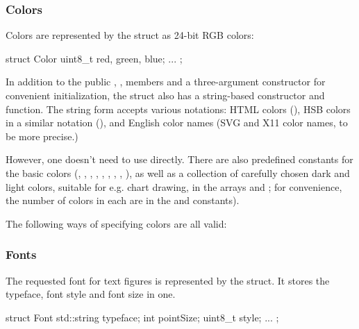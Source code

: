 \subsubsection{Colors}
\label{sec:graphics:canvas-colors}

Colors are represented by the  struct as 24-bit RGB colors:

\begin{cpp}
struct Color {
    uint8_t red, green, blue;
    ...
};
\end{cpp}

In addition to the public , ,  members
and a three-argument constructor for convenient initialization, the struct
also has a string-based constructor and  function.
The string form accepts various notations: HTML colors (),
HSB colors in a similar notation (), and English color names
(SVG and X11 color names, to be more precise.)

However, one doesn't need to use  directly.
There are also predefined constants for the basic colors (,
, , , , , ,
, ), as well as a collection of carefully chosen
dark and light colors, suitable for e.g. chart drawing, in the arrays
 and ; for convenience,
the number of colors in each are in the 
and  constants).

The following ways of specifying colors are all valid:



\subsubsection{Fonts}
\label{sec:graphics:canvas-fonts}

The requested font for text figures is represented by the 
struct. It stores the typeface, font style and font size in one.

\begin{cpp}
struct Font {
    std::string typeface;
    int pointSize;
    uint8_t style;
    ...
};
\end{cpp}

